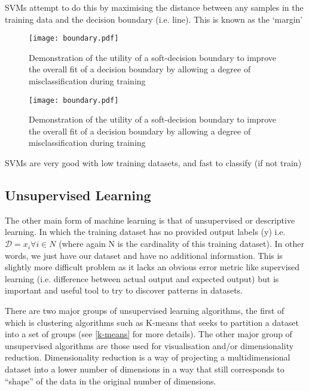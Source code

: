 SVMs attempt to do this by maximising the distance between any samples in the training data and the decision boundary (i.e. line). 
This is known as the `margin' 





\begin{figure}[h]
    \texttt{[image: boundary.pdf]}
    \caption{Demonstration of the utility of a soft-decision boundary to improve the overall
    fit of a decision boundary by allowing a degree of misclassification during training}
    \label{fig:boundary}
\end{figure}




\begin{figure}[h]
    \texttt{[image: boundary.pdf]}
    \caption{Demonstration of the utility of a soft-decision boundary to improve the overall
    fit of a decision boundary by allowing a degree of misclassification during training}
    \label{fig:boundary}
\end{figure}



SVMs are very good with low training datasets, and fast to classify (if not train) 







\subsection{Unsupervised Learning}

The other main form of machine learning is that of unsupervised or descriptive learning.
In which the training dataset has no provided output labels (y) i.e. 
\(\mathcal{D} = {x_{i} \forall i \in N}\) (where again N is the cardinality of 
this training dataset). In other words, we just have our dataset and have no additional information.
This is slightly more difficult problem as it lacks an obvious error metric like supervised learning 
(i.e. difference between actual output and expected output) but is important and useful tool to
try to discover patterns in datasets.

There are two major groups of unsupervised learning algorithms, the first of which is clustering algorithms
such as K-means that seeks to partition a dataset into a set of groups (see \ref{k-means} for more details).
The other major group of unsupervised algorithms are those used for visualisation and/or
dimensionality reduction.  Dimensionality reduction is a way of projecting a multidimensional
dataset into a lower number of dimensions in a way that still corresponds to
``shape'' of the data in the original number of dimensions.  

